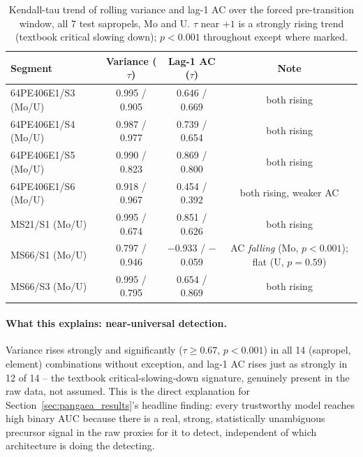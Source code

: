 \begin{table}[htbp]
\centering
\small
\caption{Kendall-tau trend of rolling variance and lag-1 AC over the forced pre-transition window, all 7 test sapropels, Mo and U. $\tau$ near $+1$ is a strongly rising trend (textbook critical slowing down); $p<0.001$ throughout except where marked.}
\label{tab:ews_trends}
\begin{tabular}{lccc}
\toprule
Segment & Variance ($\tau$) & Lag-1 AC ($\tau$) & Note \\
\midrule
64PE406E1/S3 (Mo/U) & 0.995 / 0.905 & 0.646 / 0.669 & both rising \\
64PE406E1/S4 (Mo/U) & 0.987 / 0.977 & 0.739 / 0.654 & both rising \\
64PE406E1/S5 (Mo/U) & 0.990 / 0.823 & 0.869 / 0.800 & both rising \\
64PE406E1/S6 (Mo/U) & 0.918 / 0.967 & 0.454 / 0.392 & both rising, weaker AC \\
MS21/S1 (Mo/U) & 0.995 / 0.674 & 0.851 / 0.626 & both rising \\
MS66/S1 (Mo/U) & 0.797 / 0.946 & $-$0.933 / $-$0.059 & AC \emph{falling} (Mo, $p<0.001$); flat (U, $p=0.59$) \\
MS66/S3 (Mo/U) & 0.995 / 0.795 & 0.654 / 0.869 & both rising \\
\bottomrule
\end{tabular}
\end{table}

\paragraph{What this explains: near-universal detection.} Variance rises strongly and significantly ($\tau \geq 0.67$, $p<0.001$) in all 14 (sapropel, element) combinations without exception, and lag-1 AC rises just as strongly in 12 of 14 -- the textbook critical-slowing-down signature, genuinely present in the raw data, not assumed. This is the direct explanation for Section~\ref{sec:pangaea_results}'s headline finding: every trustworthy model reaches high binary AUC because there is a real, strong, statistically unambiguous precursor signal in the raw proxies for it to detect, independent of which architecture is doing the detecting.

